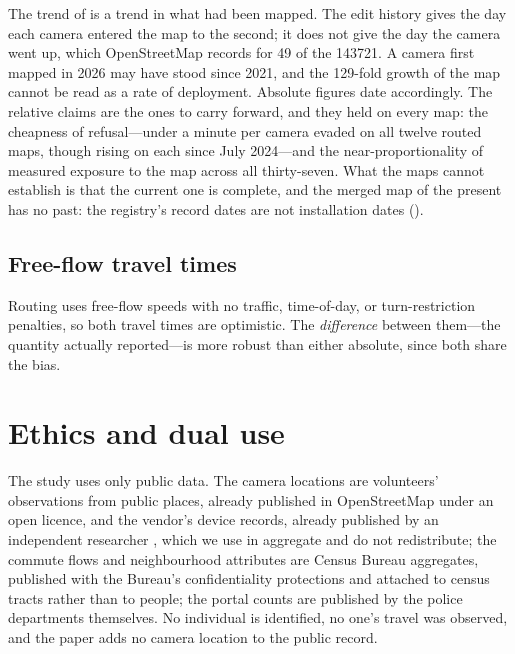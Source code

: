 \documentclass[11pt,twoside]{article}
\begin{document}
The trend of  is a trend in what had been mapped. The edit history
gives the day each camera entered the map to the second; it does not give the day the camera
went up, which OpenStreetMap records for 49 of the \num{143721}. A camera first mapped in
2026 may have stood since 2021, and the 129-fold growth of the map cannot be read as a rate of
deployment. Absolute figures date accordingly. The relative claims are the ones to carry
forward, and they held on every map: the cheapness of refusal---under a minute per camera
evaded on all twelve routed maps, though rising on each since July 2024---and the near-proportionality of
measured exposure to the map across all thirty-seven. What the maps cannot establish is that the
current one is complete, and the merged map of the present has no past: the registry's record
dates are not installation dates ().

\subsection{Free-flow travel times}

Routing uses free-flow speeds with no traffic, time-of-day, or turn-restriction penalties,
so both travel times are optimistic. The \emph{difference} between them---the quantity
actually reported---is more robust than either absolute, since both share the bias.

\section{Ethics and dual use}
\label{sec:ethics}

The study uses only public data. The camera locations are volunteers' observations from public
places, already published in OpenStreetMap under an open licence, and the vendor's device
records, already published by an independent researcher \citep{michael2026}, which we use in
aggregate and do not redistribute; the commute flows and
neighbourhood attributes are Census Bureau aggregates, published with the Bureau's
confidentiality protections and attached to census tracts rather than to people; the portal
counts are published by the police departments themselves. No individual is identified, no
one's travel was observed, and the paper adds no camera location to the public record.
\end{document}
